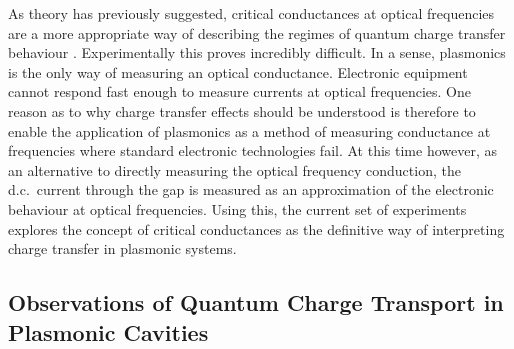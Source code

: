 \documentclass[a4paper]{article}
\begin{document}
As theory has previously suggested, critical conductances at optical frequencies are a more appropriate way of describing the regimes of quantum charge transfer behaviour \cite{perez2011, benz2014}. Experimentally this proves incredibly difficult. In a sense, plasmonics is the only way of measuring an optical conductance. Electronic equipment cannot respond fast enough to measure currents at optical frequencies. One reason as to why charge transfer effects should be understood is therefore to enable the application of plasmonics as a method of measuring conductance at frequencies where standard electronic technologies fail. At this time however, as an alternative to directly measuring the optical frequency conduction, the d.c.\ current through the gap is measured as an approximation of the electronic behaviour at optical frequencies. Using this, the current set of experiments explores the concept of critical conductances as the definitive way of interpreting charge transfer in plasmonic systems. %

\subsection{Observations of Quantum Charge Transport in Plasmonic Cavities}
\end{document}
